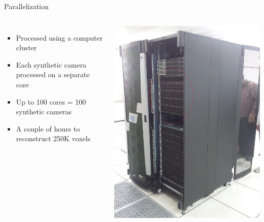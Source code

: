 \documentclass[compress,red,12pt]{beamer}
\begin{document}
\begin{frame}{Parallelization} 
  \begin{columns}
    \begin{itemize}
    \item Processed using a computer cluster
    \item Each synthetic camera processed on a separate core
    \item Up to 100 cores = 100 synthetic cameras
    \item A couple of hours to reconstruct 250K voxels
    \end{itemize}

    \begin{center}
      \includegraphics[width=\columnwidth]{tamnun.jpg}
    \end{center}
  \end{columns}
\end{frame}
\end{document}

